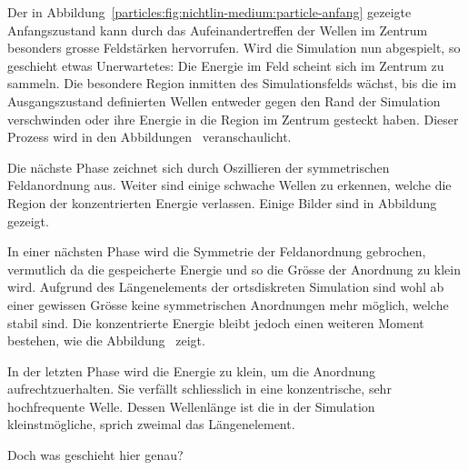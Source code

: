 Der in Abbildung~\ref{particles:fig:nichtlin-medium:particle-anfang} gezeigte Anfangszustand kann durch das Aufeinandertreffen der Wellen im Zentrum besonders grosse Feldstärken hervorrufen.
Wird die Simulation nun abgespielt, so geschieht etwas Unerwartetes: Die Energie im Feld scheint sich im Zentrum zu sammeln.
Die besondere Region inmitten des Simulationsfelds wächst, bis die im Ausgangszustand definierten Wellen entweder gegen den Rand der Simulation verschwinden oder ihre Energie in die Region im Zentrum gesteckt haben.
Dieser Prozess wird in den Abbildungen~ veranschaulicht.

Die nächste Phase zeichnet sich durch Oszillieren der symmetrischen Feldanordnung aus. 
Weiter sind einige schwache Wellen zu erkennen, welche die Region der konzentrierten Energie verlassen.
Einige Bilder sind in Abbildung~ gezeigt.

In einer nächsten Phase wird die Symmetrie der Feldanordnung gebrochen, vermutlich da die gespeicherte Energie und so die Grösse der Anordnung zu klein wird.
Aufgrund des Längenelements der ortsdiskreten Simulation sind wohl ab einer gewissen Grösse keine symmetrischen Anordnungen mehr möglich, welche stabil sind.
Die konzentrierte Energie bleibt jedoch einen weiteren Moment bestehen, wie die Abbildung~ zeigt.

In der letzten Phase wird die Energie zu klein, um die Anordnung aufrechtzuerhalten. 
Sie verfällt schliesslich in eine konzentrische, sehr hochfrequente Welle. 
Dessen Wellenlänge ist die in der Simulation kleinstmögliche, sprich zweimal das Längenelement.


Doch was geschieht hier genau? 

